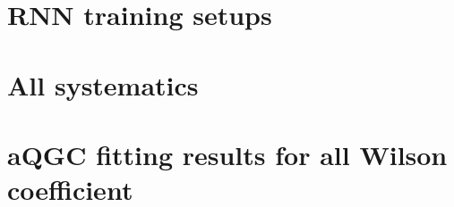 
%
%

\clearpage
\section{RNN training setups}
\label{app:RNNsetup}


\clearpage
\section{All systematics}
\label{app:allsyst}


%

%
\clearpage
\section{aQGC fitting results for all Wilson coefficient}
\label{app:aQGCresults}

